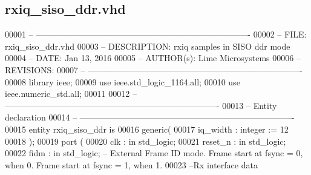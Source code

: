 \subsection{rxiq\+\_\+siso\+\_\+ddr.\+vhd}
\label{rxiq__siso__ddr_8vhd_source}

\begin{DoxyCode}
00001 \textcolor{keyword}{-- ---------------------------------------------------------------------------- }
00002 \textcolor{keyword}{-- FILE:    rxiq\_siso\_ddr.vhd}
00003 \textcolor{keyword}{-- DESCRIPTION: rxiq samples in SISO ddr mode}
00004 \textcolor{keyword}{-- DATE:    Jan 13, 2016}
00005 \textcolor{keyword}{-- AUTHOR(s):   Lime Microsystems}
00006 \textcolor{keyword}{-- REVISIONS:}
00007 \textcolor{keyword}{-- ---------------------------------------------------------------------------- }
00008 \textcolor{vhdlkeyword}{library }\textcolor{keywordflow}{ieee};
00009 \textcolor{vhdlkeyword}{use }ieee.std\_logic\_1164.\textcolor{keywordflow}{all};
00010 \textcolor{vhdlkeyword}{use }ieee.numeric\_std.\textcolor{keywordflow}{all};
00011 
00012 \textcolor{keyword}{-- ----------------------------------------------------------------------------}
00013 \textcolor{keyword}{-- Entity declaration}
00014 \textcolor{keyword}{-- ----------------------------------------------------------------------------}
00015 \textcolor{keywordflow}{entity }rxiq_siso_ddr \textcolor{keywordflow}{is}
00016    \textcolor{keywordflow}{generic}\textcolor{vhdlchar}{(}
00017       \textcolor{vhdlchar}{iq_width}                  \textcolor{vhdlchar}{:} \textcolor{comment}{integer} \textcolor{vhdlchar}{:=} \textcolor{vhdllogic}{}\textcolor{vhdllogic}{12}
00018    \textcolor{vhdlchar}{)};
00019   \textcolor{keywordflow}{port} \textcolor{vhdlchar}{(}
00020       \textcolor{vhdlchar}{clk}         \textcolor{vhdlchar}{:} \textcolor{keywordflow}{in} \textcolor{comment}{std\_logic};
00021       \textcolor{vhdlchar}{reset_n}     \textcolor{vhdlchar}{:} \textcolor{keywordflow}{in} \textcolor{comment}{std\_logic};
00022       \textcolor{vhdlchar}{fidm}         \textcolor{vhdlchar}{:} \textcolor{keywordflow}{in} \textcolor{comment}{std\_logic};\textcolor{keyword}{ -- External Frame ID mode. Frame start at fsync = 0, when 0. Frame start
       at fsync = 1, when 1.}
00023 \textcolor{keyword}{      --Rx interface data }

\end{DoxyCode}
